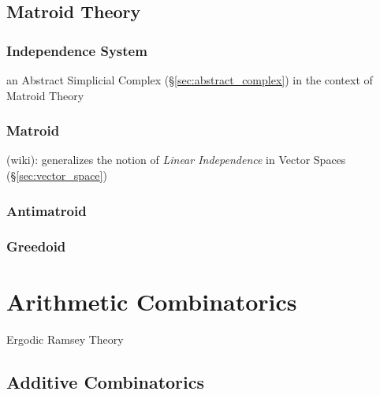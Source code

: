 \subsection{Matroid Theory}\label{sec:matroid_theory}

\subsubsection{Independence System}\label{sec:independence_system}

an Abstract Simplicial Complex (\S\ref{sec:abstract_complex}) in the context of
Matroid Theory



\subsubsection{Matroid}\label{sec:matroid}

(wiki): generalizes the notion of \emph{Linear Independence} in Vector Spaces
(\S\ref{sec:vector_space})



\subsubsection{Antimatroid}\label{sec:antimatroid}

\subsubsection{Greedoid}\label{sec:greedoid}



\section{Arithmetic Combinatorics}\label{sec:arithmetic_combinatorics}

Ergodic Ramsey Theory



\subsection{Additive Combinatorics}\label{sec:additive_combinatorics}

